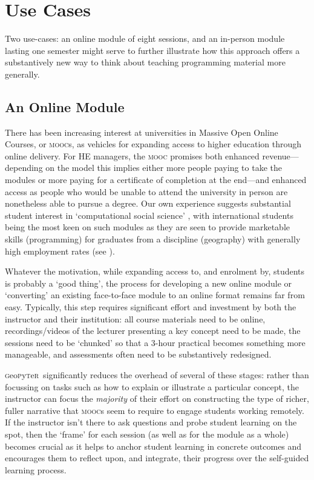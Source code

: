 \documentclass[letter, 11pt]{article}
\newcommand{\gp}{\textsc{g}eo\textsc{p}y\textsc{t}e\textsc{r}~\/}
\begin{document}
\section{Use Cases}\label{uses}

Two use-cases: an online module of eight sessions, and an in-person module
lasting one semester might serve to further illustrate how this approach offers
a substantively new way to think about teaching programming material more
generally.

\subsection{An Online Module}\label{an-online-module}

There has been increasing interest at universities in Massive Open Online
Courses, or \textsc{mooc}s, as vehicles for expanding access to higher education
through online delivery. For HE managers, the \textsc{mooc} promises both
enhanced revenue---depending on the model this implies either more people paying
to take the modules or more paying for a certificate of completion at the
end---and enhanced access as people who would be unable to attend the university
in person are nonetheless able to pursue a degree. Our own experience suggests
substantial student interest in `computational social science'
\citep{Lazer2009}, with international students being the most keen on such
modules as they are seen to provide marketable skills (programming) for
graduates from a discipline (geography) with generally high employment rates
(see \citeauthor{rgs2017} \citeyear{rgs2017}).

Whatever the motivation, while expanding access to, and enrolment by, students
is probably a `good thing', the process for developing a new online module or
`converting' an existing face-to-face module to an online format remains far
from easy. Typically, this step requires significant effort and investment by
both the instructor and their institution: all course materials need to be
online, recordings/videos of the lecturer presenting a key concept need to be
made, the sessions need to be `chunked' so that a 3-hour practical becomes
something more manageable, and assessments often need to be substantively
redesigned.

\gp significantly reduces the overhead of several of these stages: rather than
focussing on tasks such as how to explain or illustrate a particular concept,
the instructor can focus the \emph{majority} of their effort on constructing the
type of richer, fuller narrative that \textsc{mooc}s seem to require to engage
students working remotely. If the instructor isn't there to ask questions and
probe student learning on the spot, then the `frame' for each session (as well
as for the module as a whole) becomes crucial as it helps to anchor student
learning in concrete outcomes and encourages them to reflect upon, and
integrate, their progress over the self-guided learning process.
\end{document}
